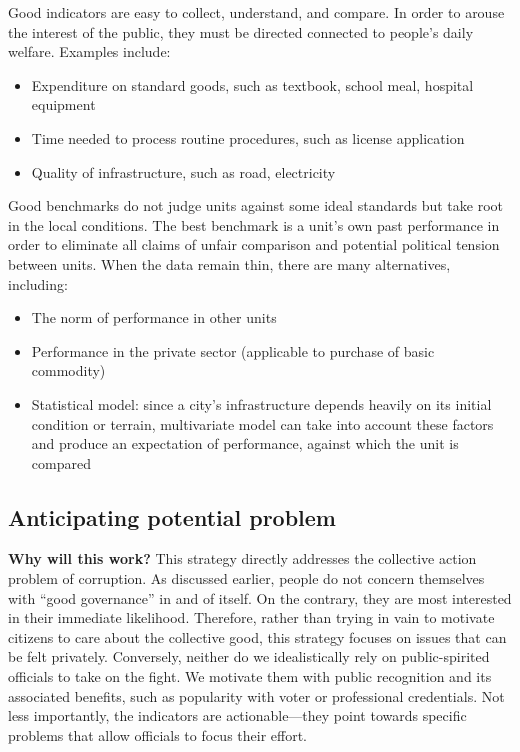 \documentclass[12pt]{article}
\begin{document}
Good indicators are easy to collect, understand, and compare. In order to arouse the interest of the public, they must be directed connected to people's daily welfare. Examples include:
\begin{itemize}[noitemsep]
\item{Expenditure on standard goods, such as textbook, school meal, hospital equipment}
\item{Time needed to process routine procedures, such as license application}
\item{Quality of infrastructure, such as road, electricity}
\end{itemize}

Good benchmarks do not judge units against some ideal standards but take root in the local conditions. The best benchmark is a unit's own past performance in order to eliminate all claims of unfair comparison and potential political tension between units. When the data remain thin, there are many alternatives, including:
\begin{itemize}[noitemsep]
\item{The norm of performance in other units}
\item{Performance in the private sector (applicable to purchase of basic commodity)}
\item{Statistical model: since a city's infrastructure depends heavily on its initial condition or terrain, multivariate model can take into account these factors and produce an expectation of performance, against which the unit is compared}
\end{itemize}

\subsection{Anticipating potential problem}
\label{sec:potentialproblem}

\textbf{Why will this work?} This strategy directly addresses the collective action problem of corruption. As discussed earlier, people do not concern themselves with ``good governance'' in and of itself. On the contrary, they are most interested in their immediate likelihood. Therefore, rather than trying in vain to motivate citizens to care about the collective good, this strategy focuses on issues that can be felt privately. Conversely, neither do we idealistically rely on public-spirited officials to take on the fight. We motivate them with public recognition and its associated benefits, such as popularity with voter or professional credentials. Not less importantly, the indicators are actionable---they point towards specific problems that allow officials to focus their effort.
\end{document}
